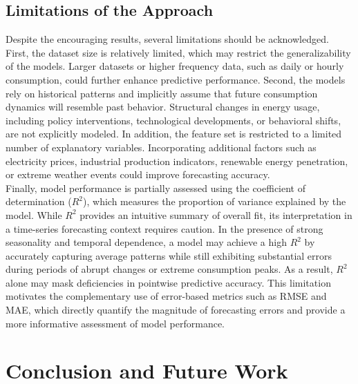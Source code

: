 \documentclass[11pt,a4paper]{article}
\begin{document}
\subsection{Limitations of the Approach}

Despite the encouraging results, several limitations should be acknowledged. First, the dataset size is relatively limited, which may restrict the generalizability of the models. Larger datasets or higher frequency data, such as daily or hourly consumption, could further enhance predictive performance. Second, the models rely on historical patterns and implicitly assume that future consumption dynamics will resemble past behavior. Structural changes in energy usage, including policy interventions, technological developments, or behavioral shifts, are not explicitly modeled. In addition, the feature set is restricted to a limited number of explanatory variables. Incorporating additional factors such as electricity prices, industrial production indicators, renewable energy penetration, or extreme weather events could improve forecasting accuracy. \\Finally, model performance is partially assessed using the coefficient of determination ($R^2$), which measures the proportion of variance explained by the model. While $R^2$ provides an intuitive summary of overall fit, its interpretation in a time-series forecasting context requires caution. In the presence of strong seasonality and temporal dependence, a model may achieve a high $R^2$ by accurately capturing average patterns while still exhibiting substantial errors during periods of abrupt changes or extreme consumption peaks. As a result, $R^2$ alone may mask deficiencies in pointwise predictive accuracy. This limitation motivates the complementary use of error-based metrics such as RMSE and MAE, which directly quantify the magnitude of forecasting errors and provide a more informative assessment of model performance.\\


\section{Conclusion and Future Work}
\label{sec:conclusion}
\end{document}
